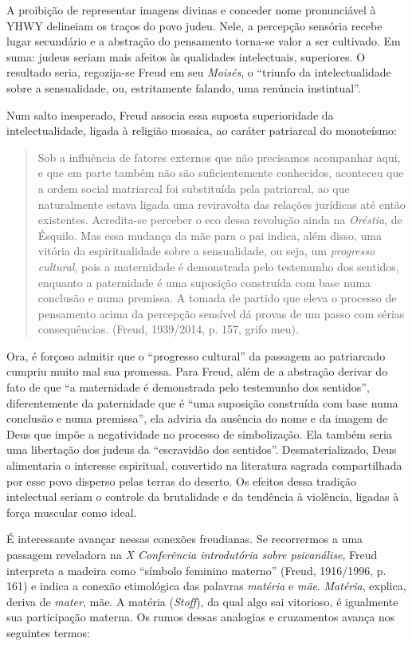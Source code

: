 A proibição de representar imagens divinas e conceder nome pronunciável
à YHWY delineiam os traços do povo judeu. Nele, a percepção sensória
recebe lugar secundário e a abstração do pensamento torna-se valor a ser
cultivado. Em suma: judeus seriam mais afeitos às qualidades
intelectuais, superiores. O resultado seria, regozija-se Freud em seu
\emph{Moisés}, o ``triunfo da intelectualidade sobre a sensualidade, ou,
estritamente falando, uma renúncia instintual''.

Num salto inesperado, Freud associa essa suposta superioridade da
intelectualidade, ligada à religião mosaica, ao caráter patriarcal do
monoteísmo:

\begin{quote}
Sob a influência de fatores externos que não precisamos acompanhar aqui,
e que em parte também não são suficientemente conhecidos, aconteceu que
a ordem social matriarcal foi substituída pela patriarcal, ao que
naturalmente estava ligada uma reviravolta das relações jurídicas até
então existentes. Acredita-se perceber o eco dessa revolução ainda na
\emph{Oréstia}, de Ésquilo. Mas essa mudança da mãe para o pai indica,
além disso, uma vitória da espiritualidade sobre a sensualidade, ou
seja, um \emph{progresso cultural}, pois a maternidade é demonstrada
pelo testemunho dos sentidos, enquanto a paternidade é uma suposição
construída com base numa conclusão e numa premissa. A tomada de partido
que eleva o processo de pensamento acima da percepção sensível dá provas
de um passo com sérias consequências. (Freud, 1939/2014, p. 157, grifo
meu).
\end{quote}

Ora, é forçoso admitir que o ``progresso cultural'' da passagem ao
patriarcado cumpriu muito mal sua promessa. Para Freud, além de a
abstração derivar do fato de que ``a maternidade é demonstrada pelo
testemunho dos sentidos'', diferentemente da paternidade que é ``uma
suposição construída com base numa conclusão e numa premissa'', ela
adviria da ausência do nome e da imagem de Deus que impõe a negatividade
no processo de simbolização. Ela também seria uma libertação dos judeus
da ``escravidão dos sentidos''. Desmaterializado, Deus alimentaria o
interesse espiritual, convertido na literatura sagrada compartilhada por
esse povo disperso pelas terras do deserto. Os efeitos dessa tradição
intelectual seriam o controle da brutalidade e da tendência à violência,
ligadas à força muscular como ideal.

É interessante avançar nessas conexões freudianas. Se recorrermos a uma
passagem reveladora na \emph{X Conferência introdutória sobre
psicanálise}, Freud interpreta a madeira como ``símbolo feminino
materno'' (Freud, 1916/1996, p. 161) e indica a conexão etimológica das
palavras \emph{matéria} e \emph{mãe}. \emph{Matéria}, explica, deriva de
\emph{mater}, mãe. A matéria (\emph{Stoff}), da qual algo sai vitorioso,
é igualmente sua participação materna. Os rumos dessas analogias e
cruzamentos avança nos seguintes termos:

